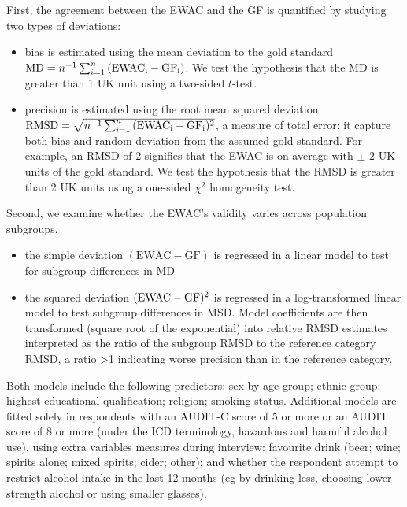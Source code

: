 \documentclass[]{article}
\providecommand{\tightlist}{%
  \setlength{\itemsep}{0pt}\setlength{\parskip}{0pt}}
\begin{document}
First, the agreement between the EWAC and the GF is quantified by
studying two types of deviations:

\begin{itemize}
\tightlist
\item
  bias is estimated using the mean deviation to the gold standard
  \(\text{MD} = n^{-1} \sum_{i=1}^{n}{(\rm{EWAC}_i - \rm{GF}_i )}\). We
  test the hypothesis that the MD is greater than 1 UK unit using a
  two-sided \(t\)-test.
\item
  precision is estimated using the root mean squared deviation
  \(\text{RMSD} = \sqrt{n^{-1} \sum_{i=1}^{n}{( \rm{EWAC}_i - \rm{GF}_i )^2}}\),
  a measure of total error: it capture both bias and random deviation
  from the assumed gold standard. For example, an RMSD of 2 signifies
  that the EWAC is on average with \(\pm\) 2 UK units of the gold
  standard. We test the hypothesis that the RMSD is greater than 2 UK
  units using a one-sided \(\chi^2\) homogeneity test.
\end{itemize}

Second, we examine whether the EWAC's validity varies across population
subgroups.

\begin{itemize}
\tightlist
\item
  the simple deviation \((\text{EWAC}-\text{GF})\) is regressed in a
  linear model to test for subgroup differences in MD
\item
  the squared deviation \((\rm{EWAC}-\rm{GF})^2\) is regressed in a
  log-transformed linear model to test subgroup differences in MSD.
  Model coefficients are then transformed (square root of the
  exponential) into relative RMSD estimates interpreted as the ratio of
  the subgroup RMSD to the reference category RMSD, a ratio
  \textgreater{}1 indicating worse precision than in the reference
  category.
\end{itemize}

Both models include the following predictors: sex by age group; ethnic
group; highest educational qualification; religion; smoking status.
Additional models are fitted solely in respondents with an AUDIT-C score
of 5 or more or an AUDIT score of 8 or more (under the ICD terminology,
hazardous and harmful alcohol use), using extra variables measures
during interview: favourite drink (beer; wine; spirits alone; mixed
spirits; cider; other); and whether the respondent attempt to restrict
alcohol intake in the last 12 months (eg by drinking less, choosing
lower strength alcohol or using smaller glasses).
\end{document}
